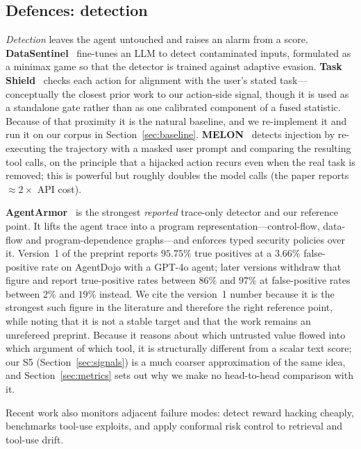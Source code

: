 \documentclass[preprint,12pt,authoryear]{elsarticle}
\theoremstyle{definition}
\begin{document}
\subsection{Defences: detection}

\emph{Detection} leaves the agent untouched and raises an alarm from a score.
\textbf{DataSentinel}~\citep{liu2025datasentinel} fine-tunes an LLM to detect
contaminated inputs, formulated as a minimax game so that the detector is trained
against adaptive evasion. \textbf{Task Shield}~\citep{jia2024taskshield} checks
each action for alignment with the user's stated task---conceptually the closest
prior work to our action-side signal, though it is used as a standalone gate
rather than as one calibrated component of a fused statistic. Because of that
proximity it is the natural baseline, and we re-implement it and run it on our
corpus in Section~\ref{sec:baseline}.
\textbf{MELON}~\citep{zhu2025melon} detects injection by re-executing the
trajectory with a masked user prompt and comparing the resulting tool calls, on
the principle that a hijacked action recurs even when the real task is removed;
this is powerful but roughly doubles the model calls (the paper reports
$\approx 2\times$ API cost).

\textbf{AgentArmor}~\citep{wang2025agentarmor} is the strongest \emph{reported}
trace-only detector and our reference point. It lifts the agent trace into a
program representation---control-flow, data-flow and program-dependence
graphs---and enforces typed security policies over it. Version~1 of the preprint
reports $95.75\%$ true positives at a $3.66\%$ false-positive rate on AgentDojo
with a GPT-4o agent; later versions withdraw that figure and report true-positive
rates between $86\%$ and $97\%$ at false-positive rates between $2\%$ and $19\%$
instead. We cite the version~1 number because it is the strongest such figure in
the literature and therefore the right reference point, while noting that it is
not a stable target and that the work remains an unrefereed preprint. Because it
reasons about which untrusted value flowed into which argument of which tool, it is
structurally different from a scalar text score; our S5 (Section~\ref{sec:signals})
is a much coarser approximation of the same idea, and Section~\ref{sec:metrics}
sets out why we make no head-to-head comparison with it.

Recent work also monitors adjacent failure modes: \citet{belenky2026cheap} detect
reward hacking cheaply, \citet{thaman2026rewardhacking} benchmarks tool-use
exploits, and \citet{opoku2026toolchain} apply conformal risk control to
retrieval and tool-use drift.
\end{document}
